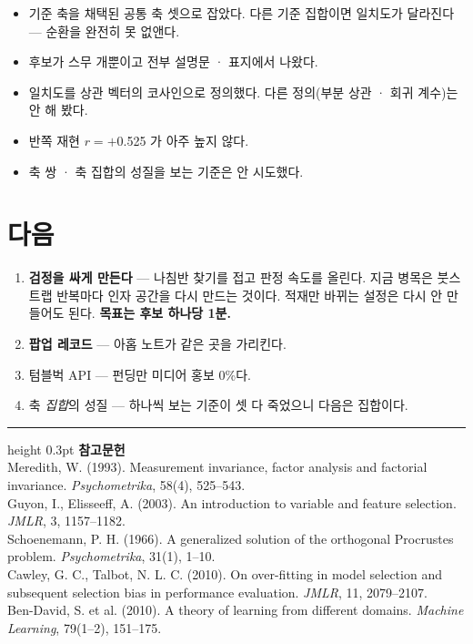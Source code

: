 \documentclass[10pt]{article}
\begin{document}
\begin{itemize}[leftmargin=1.1em,itemsep=0.15em]
\item 기준 축을 채택된 공통 축 셋으로 잡았다. 다른 기준 집합이면 일치도가
      달라진다 --- 순환을 완전히 못 없앤다.
\item 후보가 스무 개뿐이고 전부 설명문 · 표지에서 나왔다.
\item 일치도를 상관 벡터의 코사인으로 정의했다. 다른 정의(부분 상관 · 회귀
      계수)는 안 해 봤다.
\item 반쪽 재현 $r{=}+$0.525 가 아주 높지 않다.
\item 축 쌍 · 축 집합의 성질을 보는 기준은 안 시도했다.
\end{itemize}

\section{다음}

\begin{enumerate}[leftmargin=1.3em,itemsep=0.15em]
\item \textbf{검정을 싸게 만든다} --- 나침반 찾기를 접고 판정 속도를 올린다.
      지금 병목은 붓스트랩 반복마다 인자 공간을 다시 만드는 것이다. 적재만
      바뀌는 설정은 다시 안 만들어도 된다. \textbf{목표는 후보 하나당 1분.}
\item \textbf{팝업 레코드} --- 아홉 노트가 같은 곳을 가리킨다.
\item 텀블벅 API --- 펀딩만 미디어 홍보 0\%다.
\item 축 \emph{집합}의 성질 --- 하나씩 보는 기준이 셋 다 죽었으니 다음은
      집합이다.
\end{enumerate}

\vspace{0.6em}
\hrule height 0.3pt
\vspace{0.5em}
{\footnotesize
\textbf{참고문헌}\\[0.3em]
Meredith, W. (1993). Measurement invariance, factor analysis and factorial
invariance. \emph{Psychometrika}, 58(4), 525--543.\\[0.15em]
Guyon, I., Elisseeff, A. (2003). An introduction to variable and feature
selection. \emph{JMLR}, 3, 1157--1182.\\[0.15em]
Schoenemann, P. H. (1966). A generalized solution of the orthogonal Procrustes
problem. \emph{Psychometrika}, 31(1), 1--10.\\[0.15em]
Cawley, G. C., Talbot, N. L. C. (2010). On over-fitting in model selection and
subsequent selection bias in performance evaluation. \emph{JMLR}, 11, 2079--2107.\\[0.15em]
Ben-David, S. et al. (2010). A theory of learning from different domains.
\emph{Machine Learning}, 79(1--2), 151--175.
}
\end{document}
